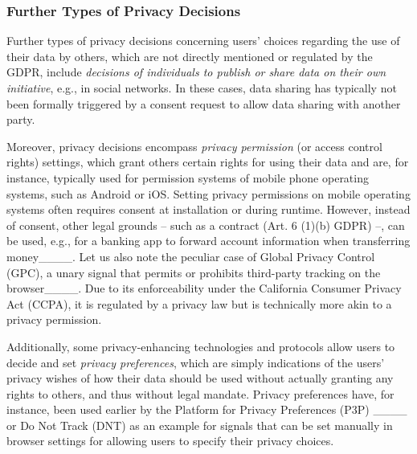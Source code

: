 \subsubsection{Further Types of Privacy Decisions}
\label{subsec:further-decisions}
Further types of privacy decisions concerning users' choices regarding the use of their data by others, which are not directly mentioned or regulated by the GDPR, include \textit{decisions of individuals to publish or share data on their own initiative}, e.g., in social networks. In these cases, data sharing has typically not been formally triggered by a consent request to allow data sharing with another party.

Moreover, privacy decisions encompass \textit{privacy permission} (or access control rights) settings, which grant others certain rights for using their data and are, for instance, typically used for permission systems of mobile phone operating systems, such as Android or iOS.
Setting privacy permissions on mobile operating systems often requires consent at installation or during runtime. 
However, instead of consent, other legal grounds -- such as a contract (Art. 6 (1)(b) GDPR) --, can be used, e.g., for a banking app to forward account information when transferring money____.
Let us also note the peculiar case of Global Privacy Control (GPC), a unary signal that permits or prohibits third-party tracking on the browser____.
Due to its enforceability under the California Consumer Privacy Act (CCPA), it is regulated by a privacy law but is technically more akin to a privacy permission.

Additionally, some privacy-enhancing technologies and protocols allow users to decide and set \textit{privacy preferences}, which are simply indications of the users' privacy wishes of how their data should be used without actually granting any rights to others, and thus without legal mandate. 
Privacy preferences have, for instance, been used earlier by the Platform for Privacy Preferences (P3P) ____ or Do Not Track (DNT) as an example for signals that can be set manually in browser settings for allowing users to specify their privacy choices.









